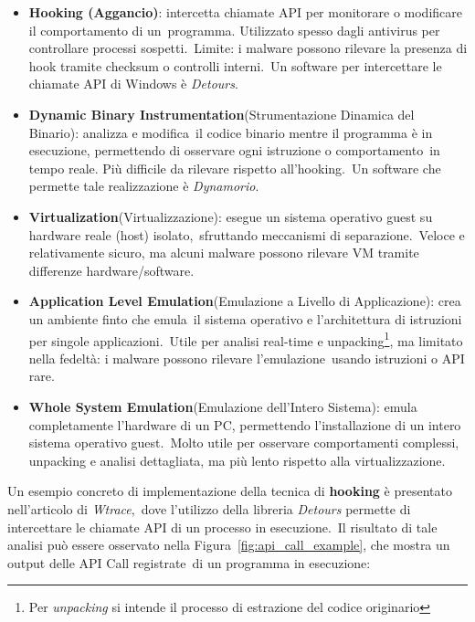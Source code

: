 \begin{itemize}
    \item \textbf{Hooking (Aggancio)}: intercetta chiamate API per monitorare o modificare il comportamento di un\
          programma. Utilizzato spesso dagli antivirus per controllare processi sospetti.\
          Limite: i malware possono rilevare la presenza di hook tramite checksum o controlli interni.\
          Un software per intercettare le chiamate API di Windows è \textit{Detours}.

    \item \textbf{Dynamic Binary Instrumentation}(Strumentazione Dinamica del Binario): analizza e modifica\
          il codice binario mentre il programma è in esecuzione, permettendo di osservare ogni istruzione o comportamento\
          in tempo reale. Più difficile da rilevare rispetto all'hooking.\
          Un software che permette tale realizzazione è \textit{Dynamorio}.\

    \item \textbf{Virtualization}(Virtualizzazione): esegue un sistema operativo guest su hardware reale (host) isolato,\
          sfruttando meccanismi di separazione.\
          Veloce e relativamente sicuro, ma alcuni malware possono rilevare VM tramite differenze hardware/software.

    \item \textbf{Application Level Emulation}(Emulazione a Livello di Applicazione): crea un ambiente finto che emula\
          il sistema operativo e l'architettura di istruzioni per singole applicazioni.\
          Utile per analisi real-time e unpacking\footnote{Per \textit{unpacking} si intende il processo di estrazione del codice originario}, ma limitato nella fedeltà: i malware possono rilevare l'emulazione\
          usando istruzioni o API rare.

    \item \textbf{Whole System Emulation}(Emulazione dell'Intero Sistema): emula completamente l'hardware di un PC,
          permettendo l'installazione di un intero sistema operativo guest.\
          Molto utile per osservare comportamenti complessi, unpacking e analisi dettagliata, ma più lento rispetto alla virtualizzazione.
\end{itemize}

Un esempio concreto di implementazione della tecnica di \textbf{hooking} è presentato nell'articolo di \textit{Wtrace},\
dove l'utilizzo della libreria \textit{Detours} permette di intercettare le chiamate API di un processo in esecuzione.\
Il risultato di tale analisi può essere osservato nella Figura~\ref{fig:api_call_example}, che mostra un output delle API Call registrate\
di un programma in esecuzione:\

